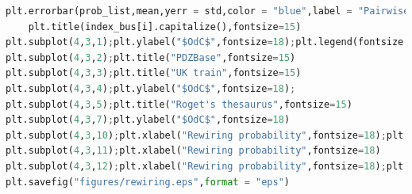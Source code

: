 \documentclass[12pt]{article}
\begin{document}
{\begin{lstlisting}[breaklines=true,language=Python]
    plt.errorbar(prob_list,mean,yerr = std,color = "blue",label = "Pairwise rewiring")
    plt.title(index_bus[i].capitalize(),fontsize=15)
plt.subplot(4,3,1);plt.ylabel("$OdC$",fontsize=18);plt.legend(fontsize = 12);plt.title("Dolphins",fontsize=15)
plt.subplot(4,3,2);plt.title("PDZBase",fontsize=15)
plt.subplot(4,3,3);plt.title("UK train",fontsize=15)
plt.subplot(4,3,4);plt.ylabel("$OdC$",fontsize=18);
plt.subplot(4,3,5);plt.title("Roget's thesaurus",fontsize=15)
plt.subplot(4,3,7);plt.ylabel("$OdC$",fontsize=18)
plt.subplot(4,3,10);plt.xlabel("Rewiring probability",fontsize=18);plt.ylabel("$OdC$",fontsize=18)
plt.subplot(4,3,11);plt.xlabel("Rewiring probability",fontsize=18)
plt.subplot(4,3,12);plt.xlabel("Rewiring probability",fontsize=18);plt.legend(fontsize = 12)
plt.savefig("figures/rewiring.eps",format = "eps")
\end{lstlisting}
}
\end{document}
